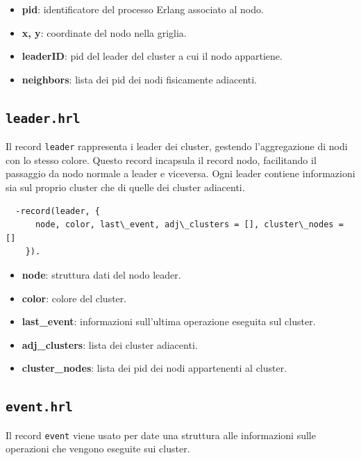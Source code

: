 \documentclass[12pt, a4paper]{report}
\begin{document}
\begin{itemize}
    \item \textbf{pid}: identificatore del processo Erlang associato al nodo.
    \item \textbf{x, y}: coordinate del nodo nella griglia.
    \item \textbf{leaderID}: pid del leader del cluster a cui il nodo appartiene.
    \item \textbf{neighbors}: lista dei pid dei nodi fisicamente adiacenti.
\end{itemize}

\subsection{\texttt{leader.hrl}}

Il record \texttt{leader} rappresenta i leader dei cluster, gestendo l’aggregazione di nodi con lo stesso colore. Questo record incapsula il record nodo, facilitando il passaggio da nodo normale a leader e viceversa. Ogni leader contiene informazioni sia sul proprio cluster che di quelle dei cluster adiacenti.

\begin{tcolorbox}[title=Definizione del record \texttt{leader}]
\begin{verbatim}
  -record(leader, {
      node, color, last\_event, adj\_clusters = [], cluster\_nodes = []
    }).
\end{verbatim}
\end{tcolorbox}

\begin{itemize}
    \item \textbf{node}: struttura dati del nodo leader.
    \item \textbf{color}: colore del cluster.
    \item \textbf{last\_event}: informazioni sull'ultima operazione eseguita sul cluster.
    \item \textbf{adj\_clusters}: lista dei cluster adiacenti.
    \item \textbf{cluster\_nodes}: lista dei pid dei nodi appartenenti al cluster.
\end{itemize}

\subsection{\texttt{event.hrl}}

Il record \texttt{event} viene usato per date una struttura alle informazioni sulle operazioni che vengono eseguite sui cluster.
\end{document}
